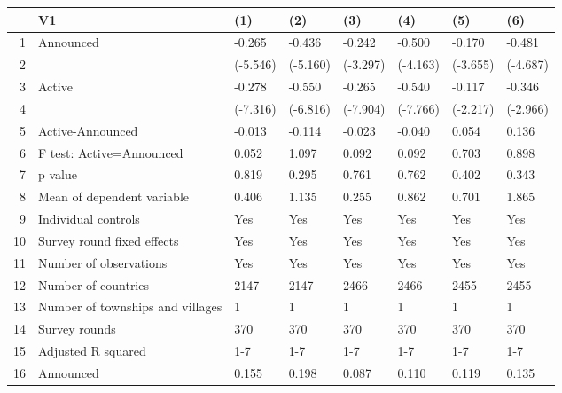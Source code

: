 \begin{table}[ht]
\centering
\begin{tabular}{rlllllll}
  \hline
 & V1 & (1) & (2) & (3) & (4) & (5) & (6) \\ 
  \hline
1 & Announced & -0.265 & -0.436 & -0.242 & -0.500 & -0.170 & -0.481 \\ 
  2 &  & (-5.546) & (-5.160) & (-3.297) & (-4.163) & (-3.655) & (-4.687) \\ 
  3 & Active & -0.278 & -0.550 & -0.265 & -0.540 & -0.117 & -0.346 \\ 
  4 &  & (-7.316) & (-6.816) & (-7.904) & (-7.766) & (-2.217) & (-2.966) \\ 
  5 & Active-Announced & -0.013 & -0.114 & -0.023 & -0.040 & 0.054 & 0.136 \\ 
  6 & F test: Active=Announced & 0.052 & 1.097 & 0.092 & 0.092 & 0.703 & 0.898 \\ 
  7 & p value & 0.819 & 0.295 & 0.761 & 0.762 & 0.402 & 0.343 \\ 
  8 & Mean of dependent variable & 0.406 & 1.135 & 0.255 & 0.862 & 0.701 & 1.865 \\ 
  9 & Individual controls & Yes & Yes & Yes & Yes & Yes & Yes \\ 
  10 & Survey round fixed effects & Yes & Yes & Yes & Yes & Yes & Yes \\ 
  11 & Number of observations & Yes & Yes & Yes & Yes & Yes & Yes \\ 
  12 & Number of countries & 2147 & 2147 & 2466 & 2466 & 2455 & 2455 \\ 
  13 & Number of townships and villages & 1 & 1 & 1 & 1 & 1 & 1 \\ 
  14 & Survey rounds & 370 & 370 & 370 & 370 & 370 & 370 \\ 
  15 & Adjusted R squared & 1-7 & 1-7 & 1-7 & 1-7 & 1-7 & 1-7 \\ 
  16 & Announced & 0.155 & 0.198 & 0.087 & 0.110 & 0.119 & 0.135 \\ 
   \hline
\end{tabular}
\end{table}
